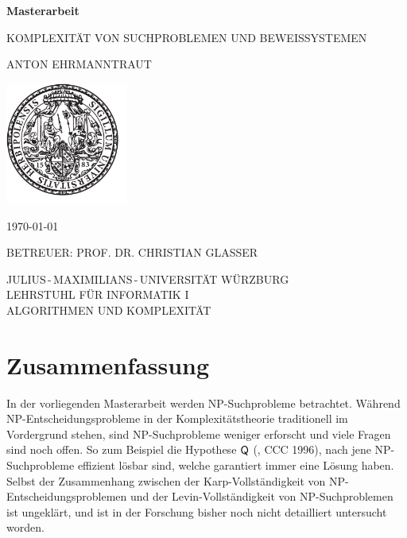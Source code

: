 \pagestyle{empty}

\begin{center}{

\vfill\sffamily

{\Large\textbf{Masterarbeit}}\par
    \vspace*{1cm}
{\huge{KOMPLEXITÄT VON SUCHPROBLEMEN UND BEWEISSYSTEMEN}}\par
    \vspace*{.3cm}
{\Large{ANTON EHRMANNTRAUT}}\par}
\vspace*{6cm}

\includegraphics[width=4cm]{siegel.pdf}

\vspace*{4cm}


\bgroup\sffamily{}
{\large\MakeUppercase{\today}}\vspace*{.7cm}

{\large BETREUER: PROF. DR. CHRISTIAN GLASSER}\vspace*{.5cm}


{\large
JULIUS\,-\,MAXIMILIANS\,-\,UNIVERSITÄT WÜRZBURG\\
LEHRSTUHL FÜR INFORMATIK I\\
ALGORITHMEN UND KOMPLEXITÄT
}
\egroup


\end{center}

\cleardoublepage
\restoregeometry

\section*{Zusammenfassung}
In der vorliegenden Masterarbeit werden NP-Suchprobleme betrachtet. Während NP-Entscheidungsprobleme in der Komplexitätstheorie traditionell im Vordergrund stehen, sind NP-Suchprobleme weniger erforscht und viele Fragen sind noch offen.
So zum Beispiel die Hypothese $\mathsf{Q}$ (\citeauthor{fenner_inverting_1996}, CCC 1996), nach jene NP-Suchprobleme effizient lösbar sind, welche garantiert immer eine Lösung haben.
Selbst der Zusammenhang zwischen der Karp-Vollständigkeit von NP-Entscheidungsproblemen und der Levin-Vollständigkeit von NP-Suchproblemen ist ungeklärt, und ist in der Forschung bisher noch nicht detailliert untersucht worden.

